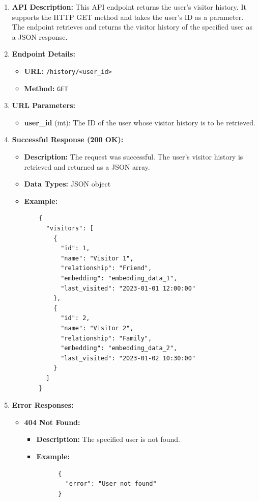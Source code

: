 \documentclass[a4 paper, 12pt]{article}
\begin{document}
\begin{enumerate}
  \item \textbf{API Description:} This API endpoint returns the user's visitor history. It supports the HTTP GET method and takes the user's ID as a parameter. The endpoint retrieves and returns the visitor history of the specified user as a JSON response.

  \item \textbf{Endpoint Details:}
  \begin{itemize}
    \item \textbf{URL:} \texttt{/history/<user\_id>}
    \item \textbf{Method:} \texttt{GET}
  \end{itemize}

  \item \textbf{URL Parameters:}
  \begin{itemize}
    \item \textbf{user\_id} (int): The ID of the user whose visitor history is to be retrieved.
  \end{itemize}

  \item \textbf{Successful Response (200 OK):}
  \begin{itemize}
    \item \textbf{Description:} The request was successful. The user's visitor history is retrieved and returned as a JSON array.
    \item \textbf{Data Types:} JSON object
    \item \textbf{Example:}
    \begin{verbatim}
    {
      "visitors": [
        {
          "id": 1,
          "name": "Visitor 1",
          "relationship": "Friend",
          "embedding": "embedding_data_1",
          "last_visited": "2023-01-01 12:00:00"
        },
        {
          "id": 2,
          "name": "Visitor 2",
          "relationship": "Family",
          "embedding": "embedding_data_2",
          "last_visited": "2023-01-02 10:30:00"
        }
      ]
    }
    \end{verbatim}
  \end{itemize}

  \item \textbf{Error Responses:}
  \begin{itemize}
    \item \textbf{404 Not Found:}
    \begin{itemize}
      \item \textbf{Description:} The specified user is not found.
      \item \textbf{Example:}
      \begin{verbatim}
      {
        "error": "User not found"
      }
      \end{verbatim}
    \end{itemize}
  \end{itemize}
\end{enumerate}
\end{document}
